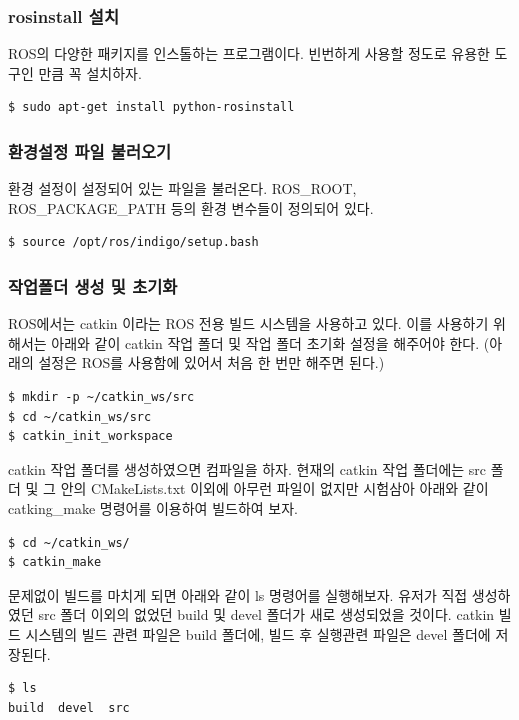 \subsubsection{rosinstall 설치}
ROS의 다양한 패키지를 인스톨하는 프로그램이다. 빈번하게 사용할 정도로 유용한 도구인 만큼 꼭 설치하자. 
\\
\begin{lstlisting}[language=ROS]
$ sudo apt-get install python-rosinstall
\end{lstlisting}

\subsubsection{환경설정 파일 불러오기}
환경 설정이 설정되어 있는 파일을 불러온다. ROS\_ROOT, ROS\_PACKAGE\_PATH 등의 환경 변수들이 정의되어 있다.
\\
\begin{lstlisting}[language=ROS]
$ source /opt/ros/indigo/setup.bash
\end{lstlisting}

\subsubsection{작업폴더 생성 및 초기화}
ROS에서는 catkin 이라는 ROS 전용 빌드 시스템을 사용하고 있다. 이를 사용하기 위해서는 아래와 같이 catkin 작업 폴더 및 작업 폴더 초기화 설정을 해주어야 한다. (아래의 설정은 ROS를 사용함에 있어서 처음 한 번만 해주면 된다.)
\\
\begin{lstlisting}[language=ROS]
$ mkdir -p ~/catkin_ws/src
$ cd ~/catkin_ws/src
$ catkin_init_workspace
\end{lstlisting}

catkin 작업 폴더를 생성하였으면 컴파일을 하자. 현재의 catkin 작업 폴더에는 src 폴더 및 그 안의 CMakeLists.txt 이외에 아무런 파일이 없지만 시험삼아 아래와 같이 catking\_make 명령어를 이용하여 빌드하여 보자. 
\\
\begin{lstlisting}[language=ROS]
$ cd ~/catkin_ws/
$ catkin_make
\end{lstlisting}

문제없이 빌드를 마치게 되면 아래와 같이 ls 명령어를 실행해보자. 유저가 직접 생성하였던 src 폴더 이외의 없었던 build 및 devel 폴더가 새로 생성되었을 것이다. catkin 빌드 시스템의 빌드 관련 파일은 build 폴더에, 빌드 후 실행관련 파일은 devel 폴더에 저장된다.
\\
\begin{lstlisting}[language=ROS]
$ ls
build  devel  src
\end{lstlisting}

